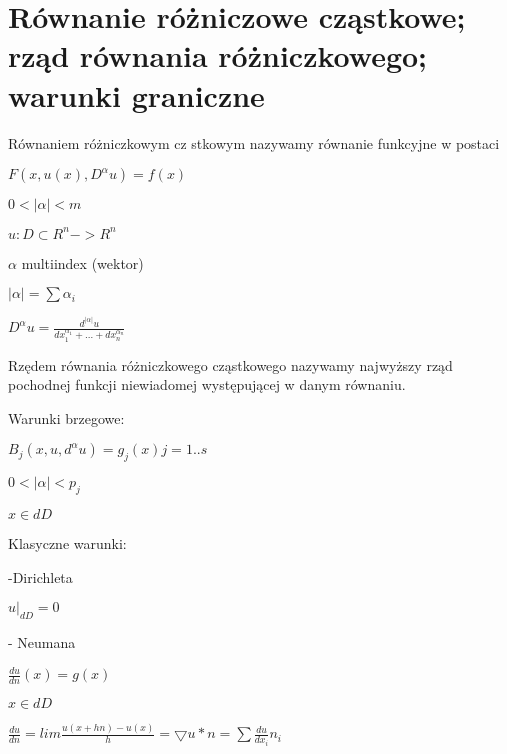 \section{Równanie różniczowe cząstkowe; rząd równania różniczkowego; warunki graniczne}
Równaniem różniczkowym cz
stkowym nazywamy równanie funkcyjne w postaci

$F(x ,u(x) , D^\alpha u) = f(x)$

$0<|\alpha| < m$

$u:D \subset R^n -> R^n$

$\alpha$ multiindex (wektor)

$|\alpha| = \sum \alpha_i$

$D^\alpha u = \frac{d^{|\alpha|} u}{dx_1^{\alpha_1} + ... + dx_n^{\alpha_n}}$


Rzędem równania różniczkowego cząstkowego nazywamy najwyższy rząd pochodnej funkcji niewiadomej występującej w danym równaniu. 

Warunki brzegowe:

$ B_j(x,u,d^\alpha u) = g_j(x) j=1 .. s $

$ 0 < |\alpha| < p_j$

$x \in dD$

Klasyczne warunki:

-Dirichleta

$ u|_{dD} =0$

- Neumana

$ \frac{du}{dn}(x) = g(x) $

$x \in dD$

$ \frac{du}{dn} = lim \frac{u(x + hn) - u(x)}{h} = \bigtriangledown u * n = \sum \frac{du}{dx_i}n_i $